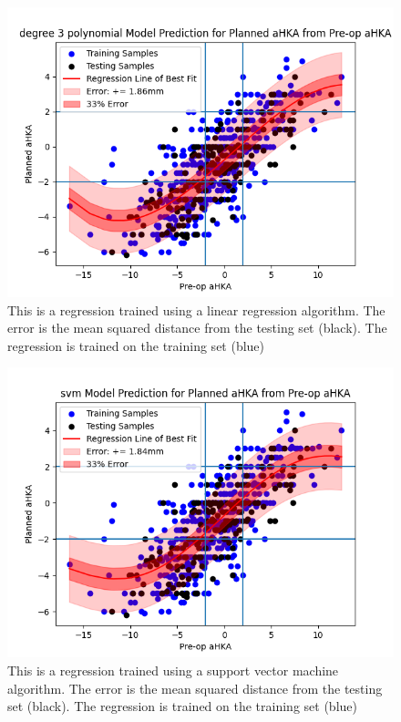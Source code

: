 \documentclass{article}
\begin{document}
\begin{figure}[h]
	\includegraphics[width=\textwidth]{degree_3_polynomial_regression.png}
	\caption{This is a regression trained using a linear regression algorithm.
	The error is the mean squared distance from the testing set (black). 
	The regression is trained on the training set (blue)}
\end{figure}


\begin{figure}[h]
	\includegraphics[width=\textwidth]{svm_regression.png}
	\caption{This is a regression trained using a support vector machine algorithm.
	The error is the mean squared distance from the testing set (black). 
	The regression is trained on the training set (blue)}
\end{figure}
\end{document}
